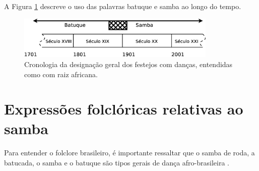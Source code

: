 A Figura \ref{fig:sambacrono} descreve o uso das palavras batuque e samba ao longo do tempo.
\begin{figure}[h]
  \centering
    \includegraphics[width=0.85\textwidth]{chapters/cap-historia-samba/samba-crono.eps}
  \caption{Cronologia da designação geral dos festejos com danças, entendidas como com raiz africana.}
  \label{fig:sambacrono}
\end{figure}

\section{Expressões folclóricas relativas ao samba}

Para entender o folclore brasileiro, 
é importante ressaltar que o samba de roda, a batucada, 
o samba e o batuque são tipos gerais de dança afro-brasileira \cite[pp. 8]{reffolclorebatucadajornal} \cite[pp. 21]{jornalsambaderoda1}.
 
